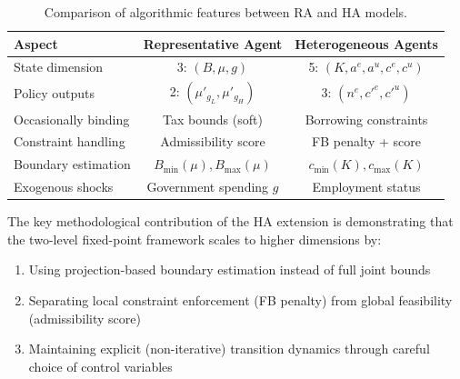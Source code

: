 \begin{table}[h]
\centering
\begin{tabular}{lcc}
\toprule
\textbf{Aspect} & \textbf{Representative Agent} & \textbf{Heterogeneous Agents} \\
\midrule
State dimension & 3: $(B, \mu, g)$ & 5: $(K, a^e, a^u, c^e, c^u)$ \\
Policy outputs & 2: $(\mu'_{g_L}, \mu'_{g_H})$ & 3: $(n^e, c'^e, c'^u)$ \\
Occasionally binding & Tax bounds (soft) & Borrowing constraints \\
Constraint handling & Admissibility score & FB penalty + score \\
Boundary estimation & $B_{\min}(\mu), B_{\max}(\mu)$ & $c_{\min}(K), c_{\max}(K)$ \\
Exogenous shocks & Government spending $g$ & Employment status \\
\bottomrule
\end{tabular}
\caption{Comparison of algorithmic features between RA and HA models.}
\label{tab:comparison}
\end{table}

The key methodological contribution of the HA extension is demonstrating that the two-level fixed-point framework scales to higher dimensions by:
\begin{enumerate}
    \item Using projection-based boundary estimation instead of full joint bounds
    \item Separating local constraint enforcement (FB penalty) from global feasibility (admissibility score)
    \item Maintaining explicit (non-iterative) transition dynamics through careful choice of control variables
\end{enumerate}

